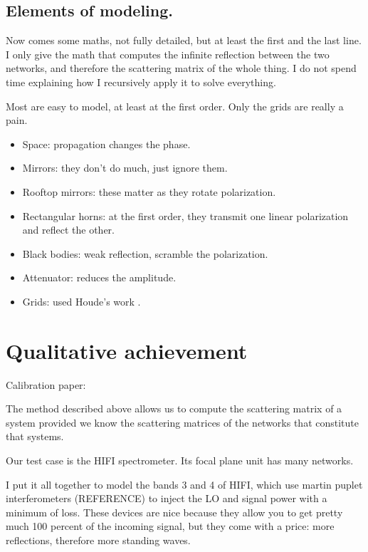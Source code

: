 \documentclass[a4paper,11pt]{article}
\begin{document}

\subsection{Elements of modeling.}

Now comes some maths, not fully detailed, but at least the first and the last line.
I only give the math that computes the infinite reflection between the two networks, and therefore the scattering matrix of the whole thing.
I do not spend time explaining how I recursively apply it to solve everything.

Most are easy to model, at least at the first order.
Only the grids are really a pain.
\begin{itemize}
    \item Space: propagation changes the phase.
    \item Mirrors: they don't do much, just ignore them.
    \item Rooftop mirrors: these matter as they rotate polarization.
    \item Rectangular horns: at the first order, they transmit one linear polarization and reflect the other.
    \item Black bodies: weak reflection, scramble the polarization.
    \item Attenuator: reduces the amplitude.
    \item Grids: used Houde's work \cite{houde_2001}.
\end{itemize}


\section{Qualitative achievement}
Calibration paper: \cite{AA_537_A17}

The method described above allows us to compute the scattering matrix of a system provided we know the scattering matrices of the networks that constitute that systems.

Our test case is the HIFI spectrometer.
Its focal plane unit has many networks.


I put it all together to model the bands 3 and 4 of HIFI, which use martin puplet  interferometers (REFERENCE) to inject the LO and signal power with a minimum of loss.
These devices are nice because they allow you to get pretty much 100 percent of the incoming signal, but they come with a price: more reflections, therefore more standing waves.
\end{document}
